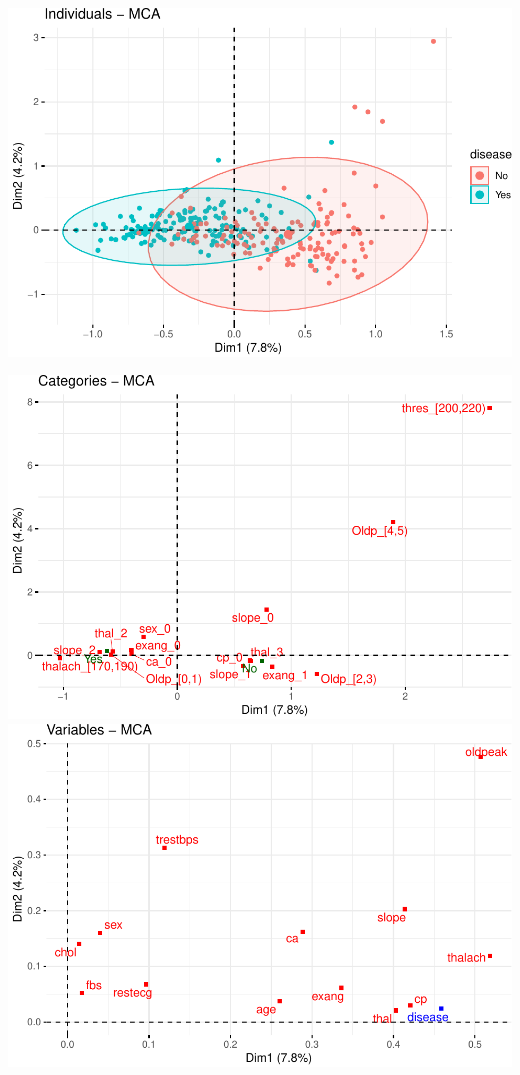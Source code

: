 \documentclass[]{article}
\begin{document}
\includegraphics{project_report_files/figure-latex/unnamed-chunk-22-1.pdf}

\includegraphics{project_report_files/figure-latex/unnamed-chunk-23-1.pdf}
\includegraphics{project_report_files/figure-latex/unnamed-chunk-23-2.pdf}
\end{document}
